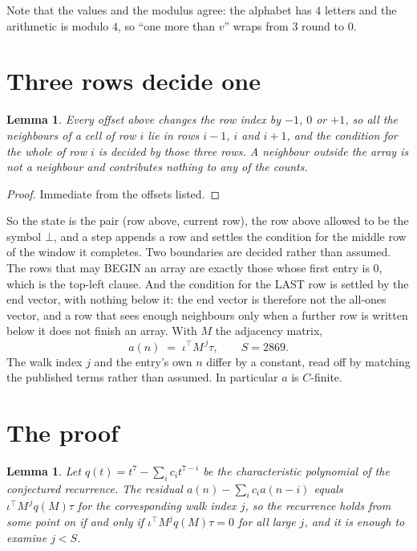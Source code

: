 \documentclass[11pt,a4paper]{article}
\theoremstyle{plain}
\newtheorem{lemma}[theorem]{Lemma}
\theoremstyle{definition}
\begin{document}
Note that the values and the modulus agree: the alphabet has $4$ letters and the arithmetic
is modulo $4$, so ``one more than $v$'' wraps from $3$ round to $0$.

\section{Three rows decide one}

\begin{lemma}\label{lem:win}
Every offset above changes the row index by $-1$, $0$ or $+1$, so all the neighbours of a cell
of row $i$ lie in rows $i-1$, $i$ and $i+1$, and the condition for the whole of row $i$ is
decided by those three rows. A neighbour outside the array is not a neighbour and contributes
nothing to any of the counts.
\end{lemma}

\begin{proof}
Immediate from the offsets listed.
\end{proof}

So the state is the pair (row above, current row), the row above allowed to be the symbol
$\bot$, and a step appends a row and settles the condition for the middle row of the window it
completes. Two boundaries are decided rather than assumed. The rows that may BEGIN an array are
exactly those whose first entry is $0$, which is the top-left clause. And the condition for the
LAST row is settled by the end vector, with nothing below it: the end vector is therefore not
the all-ones vector, and a row that sees enough neighbours only when a further row is written
below it does not finish an array. With $M$ the adjacency matrix,
\[
a(n)\;=\;\iota^{\!\top}M^{\,j}\tau ,\qquad S=2869.
\]
The walk index $j$ and the entry's own $n$ differ by a constant, read off by matching the
published terms rather than assumed. In particular $a$ is $C$-finite.

\section{The proof}

\begin{lemma}\label{lem:crit}
Let $q(t)=t^{7}-\sum_i c_it^{7-i}$ be the characteristic polynomial of the
conjectured recurrence. The residual $a(n)-\sum_ic_ia(n-i)$ equals
$\iota^{\!\top}M^{\,j}q(M)\tau$ for the corresponding walk index $j$, so the recurrence
holds from some point on if and only if $\iota^{\!\top}M^{j}q(M)\tau=0$ for all large $j$,
and it is enough to examine $j<S$.
\end{lemma}
\end{document}
